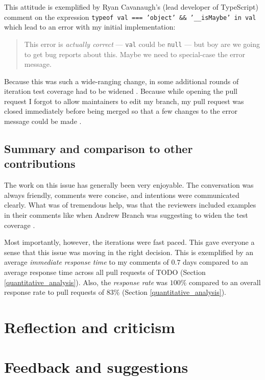 \documentclass[12pt]{scrartcl}
\def\code#1{\texttt{\frenchspacing#1}}
\let\oldsection\section
\renewcommand\section{\clearpage\oldsection}
\begin{document}
This attitude is exemplified by Ryan Cavanaugh's (lead developer of TypeScript) comment on the expression \code{typeof val === 'object' \&\& '\_\_isMaybe' in val} which lead to an error with my initial implementation:

\begin{quote}
    This error is \textit{actually correct} --- \code{val} could be \code{null} --- but boy are we going to get bug reports about this. Maybe we need to special-case the error message. \cite{41928Comment3}
\end{quote}

Because this was such a wide-ranging change, in some additional rounds of iteration test coverage had to be widened \cite{41928Comment4}. Because while opening the pull request I forgot to allow maintainers to edit my branch, my pull request was closed immediately before being merged so that a few changes to the error message could be made \cite{42288}.

\subsection{Summary and comparison to other contributions}

The work on this issue has generally been very enjoyable. The conversation was always friendly, comments were concise, and intentions were communicated clearly. What was of tremendous help, was that the reviewers included examples in their comments like when Andrew Branch was suggesting to widen the test coverage \cite{41928Comment4}.

Most importantly, however, the iterations were fast paced. This gave everyone a sense that this issue was moving in the right decision. This is exemplified by an average \textit{immediate response time} to my comments of $0.7$ days compared to an average response time across all pull requests of TODO (Section \ref{quantitative_analysis}). Also, the \textit{response rate} was $100\%$ compared to an overall response rate to pull requests of $83\%$ (Section \ref{quantitative_analysis}).

\section{Reflection and criticism}

\section{Feedback and suggestions}
\end{document}
